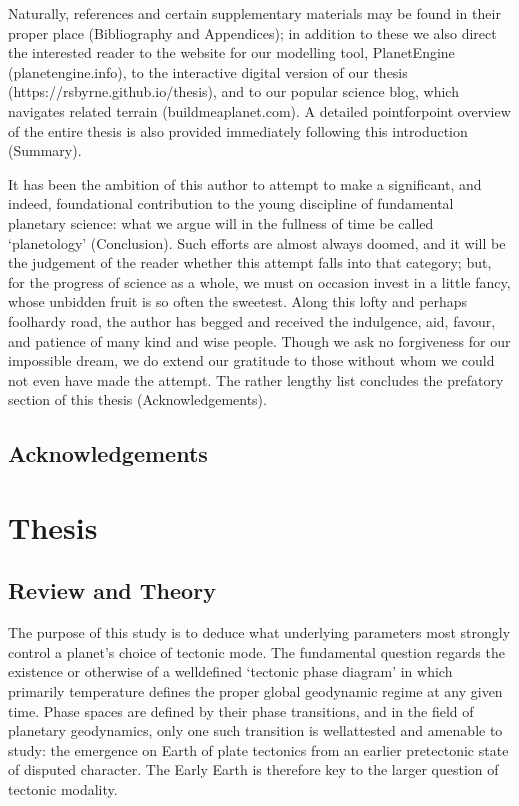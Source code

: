 \documentclass[letterpaper,10pt,english]{jupyterBook}
\begin{document}
\sphinxAtStartPar
Naturally, references and certain supplementary materials may be found in their proper place (Bibliography and Appendices); in addition to these we also direct the interested reader to the website for our modelling tool, PlanetEngine (planetengine.info), to the interactive digital version of our thesis (https://rsbyrne.github.io/thesis), and to our popular science blog, which navigates related terrain (buildmeaplanet.com). A detailed point\sphinxhyphen{}for\sphinxhyphen{}point overview of the entire thesis is also provided immediately following this introduction (Summary).

\sphinxAtStartPar
It has been the ambition of this author to attempt to make a significant, and indeed, foundational contribution to the young discipline of fundamental planetary science: what we argue will in the fullness of time be called ‘planetology’ (Conclusion). Such efforts are almost always doomed, and it will be the judgement of the reader whether this attempt falls into that category; but, for the progress of science as a whole, we must on occasion invest in a little fancy, whose unbidden fruit is so often the sweetest. Along this lofty and perhaps foolhardy road, the author has begged and received the indulgence, aid, favour, and patience of many kind and wise people. Though we ask no forgiveness for our impossible dream, we do extend our gratitude to those without whom we could not even have made the attempt. The rather lengthy list concludes the prefatory section of this thesis (Acknowledgements).


\chapter{Acknowledgements}
\label{\detokenize{frontmatter/acknowledgements:acknowledgements}}\label{\detokenize{frontmatter/acknowledgements::doc}}

\part{Thesis}


\chapter{Review and Theory}
\label{\detokenize{content/chapter_01_background/main:review-and-theory}}\label{\detokenize{content/chapter_01_background/main::doc}}
\sphinxAtStartPar
The purpose of this study is to deduce what underlying parameters most strongly control a planet’s choice of tectonic mode. The fundamental question regards the existence or otherwise of a well\sphinxhyphen{}defined ‘tectonic phase diagram’ in which primarily temperature defines the proper global geodynamic regime at any given time. Phase spaces are defined by their phase transitions, and in the field of planetary geodynamics, only one such transition is well\sphinxhyphen{}attested and amenable to study: the emergence on Earth of plate tectonics from an earlier pre\sphinxhyphen{}tectonic state of disputed character. The Early Earth is therefore key to the larger question of tectonic modality.
\end{document}
